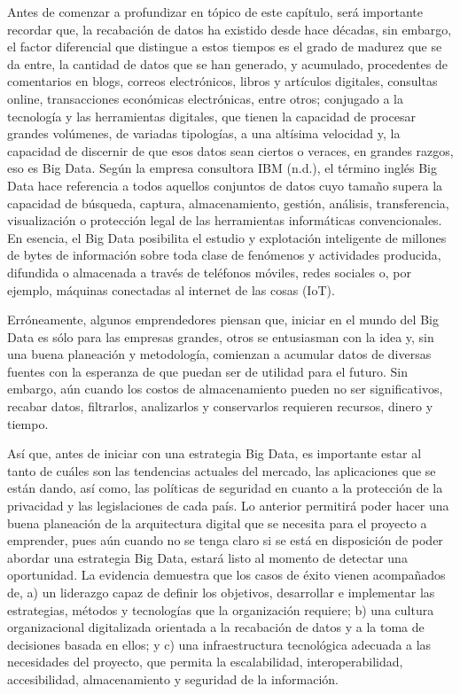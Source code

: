 \documentclass[
  letterpaper,
  DIV=11,
  numbers=noendperiod]{scrreprt}
\begin{document}
Antes de comenzar a profundizar en tópico de este capítulo, será
importante recordar que, la recabación de datos ha existido desde hace
décadas, sin embargo, el factor diferencial que distingue a estos
tiempos es el grado de madurez que se da entre, la cantidad de datos que
se han generado, y acumulado, procedentes de comentarios en blogs,
correos electrónicos, libros y artículos digitales, consultas online,
transacciones económicas electrónicas, entre otros; conjugado a la
tecnología y las herramientas digitales, que tienen la capacidad de
procesar grandes volúmenes, de variadas tipologías, a una altísima
velocidad y, la capacidad de discernir de que esos datos sean ciertos o
veraces, en grandes razgos, eso es Big Data. Según la empresa consultora
IBM (n.d.), el término inglés Big Data hace referencia a todos aquellos
conjuntos de datos cuyo tamaño supera la capacidad de búsqueda, captura,
almacenamiento, gestión, análisis, transferencia, visualización o
protección legal de las herramientas informáticas convencionales. En
esencia, el Big Data posibilita el estudio y explotación inteligente de
millones de bytes de información sobre toda clase de fenómenos y
actividades producida, difundida o almacenada a través de teléfonos
móviles, redes sociales o, por ejemplo, máquinas conectadas al internet
de las cosas (IoT).

Erróneamente, algunos emprendedores piensan que, iniciar en el mundo del
Big Data es sólo para las empresas grandes, otros se entusiasman con la
idea y, sin una buena planeación y metodología, comienzan a acumular
datos de diversas fuentes con la esperanza de que puedan ser de utilidad
para el futuro. Sin embargo, aún cuando los costos de almacenamiento
pueden no ser significativos, recabar datos, filtrarlos, analizarlos y
conservarlos requieren recursos, dinero y tiempo.

Así que, antes de iniciar con una estrategia Big Data, es importante
estar al tanto de cuáles son las tendencias actuales del mercado, las
aplicaciones que se están dando, así como, las políticas de seguridad en
cuanto a la protección de la privacidad y las legislaciones de cada
país. Lo anterior permitirá poder hacer una buena planeación de la
arquitectura digital que se necesita para el proyecto a emprender, pues
aún cuando no se tenga claro si se está en disposición de poder abordar
una estrategia Big Data, estará listo al momento de detectar una
oportunidad. La evidencia demuestra que los casos de éxito vienen
acompañados de, a) un liderazgo capaz de definir los objetivos,
desarrollar e implementar las estrategias, métodos y tecnologías que la
organización requiere; b) una cultura organizacional digitalizada
orientada a la recabación de datos y a la toma de decisiones basada en
ellos; y c) una infraestructura tecnológica adecuada a las necesidades
del proyecto, que permita la escalabilidad, interoperabilidad,
accesibilidad, almacenamiento y seguridad de la información.
\end{document}

